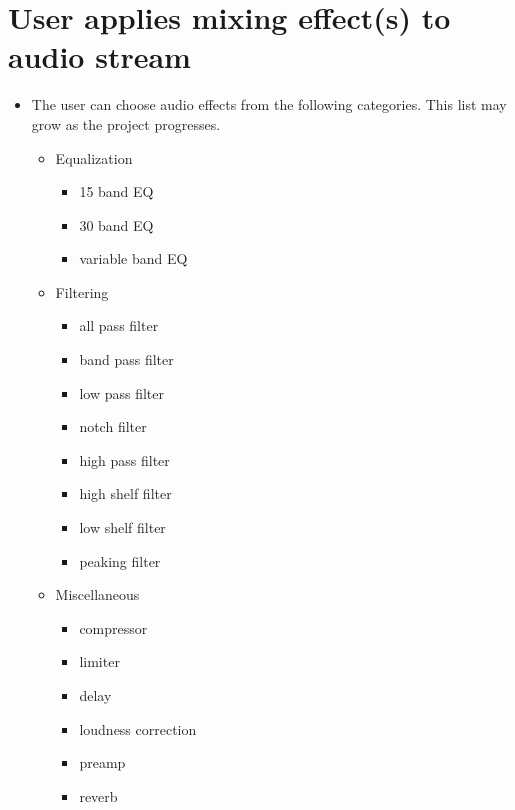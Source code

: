 \section{User applies mixing effect(s) to audio stream}

\begin{itemize}

	\item The user can choose audio effects from the following categories. This list may grow as the project progresses.
	\begin{itemize}
		\item Equalization
		\begin{itemize}
			\item 15 band EQ
			\item 30 band EQ
			\item variable band EQ
		\end{itemize}

		\item Filtering
		\begin{itemize}
			\item all pass filter
			\item band pass filter
			\item low pass filter
			\item notch filter
			\item high pass filter
			\item high shelf filter
			\item low shelf filter
			\item peaking filter
		\end{itemize}

		\item Miscellaneous
		\begin{itemize}
			\item compressor
			\item limiter
			\item delay
			\item loudness correction
			\item preamp
			\item reverb
		\end{itemize}


\end{itemize}
\end{itemize}
